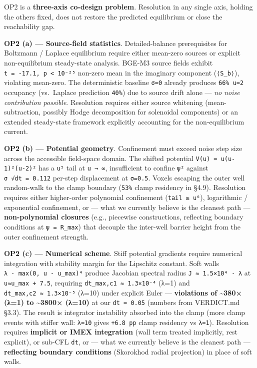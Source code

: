 \documentclass[
]{article}
\begin{document}
OP2 is a \textbf{three-axis co-design problem}. Resolution in any single
axis, holding the others fixed, does not restore the predicted
equilibrium or close the reachability gap.

\textbf{OP2 (a) --- Source-field statistics}. Detailed-balance
prerequisites for Boltzmann / Laplace equilibrium require either
mean-zero sources or explicit non-equilibrium steady-state analysis.
BGE-M3 source fields exhibit
\texttt{t\ =\ -17.1,\ p\ \textless{}\ 10⁻²⁵} non-zero mean in the
imaginary component (\texttt{⟨S\_b⟩}), violating mean-zero. The
deterministic baseline \texttt{σ=0} already produces \texttt{66\%\ u=2}
occupancy (vs.~Laplace prediction \texttt{40\%}) due to source drift
alone --- \emph{no noise contribution possible}. Resolution requires
either source whitening (mean-subtraction, possibly Hodge decomposition
for solenoidal components) or an extended steady-state framework
explicitly accounting for the non-equilibrium current.

\textbf{OP2 (b) --- Potential geometry}. Confinement must exceed noise
step size across the accessible field-space domain. The shifted
potential \texttt{V(u)\ =\ u(u-1)²(u-2)²} has a \texttt{u⁵} tail at
\texttt{u\ →\ ∞}, insufficient to confine
\texttt{\textbar{}ψ\textbar{}²} against \texttt{σ\ √dt\ =\ 0.112}
per-step displacement at \texttt{σ=0.5}. Voxels escaping the outer well
random-walk to the clamp boundary (\texttt{53\%} clamp residency in
§4.9). Resolution requires either higher-order polynomial confinement
(\texttt{tail\ ≥\ u⁶}), logarithmic / exponential confinement, or ---
what we currently believe is the cleanest path ---
\textbf{non-polynomial closures} (e.g., piecewise constructions,
reflecting boundary conditions at
\texttt{\textbar{}ψ\textbar{}\ =\ R\_max}) that decouple the inter-well
barrier height from the outer confinement strength.

\textbf{OP2 (c) --- Numerical scheme}. Stiff potential gradients require
numerical integration with stability margin for the Lipschitz constant.
Soft walls \texttt{λ\ ·\ max(0,\ u\ -\ u\_max)⁴} produce Jacobian
spectral radius \texttt{J\ ≈\ 1.5×10⁴\ ·\ λ} at
\texttt{u≈u\_max\ +\ 7.5}, requiring \texttt{dt\_max,c1\ ≈\ 1.3×10⁻⁴}
(λ=1) and \texttt{dt\_max,c2\ ≈\ 1.3×10⁻⁵} (λ=10) under explicit Euler
--- \textbf{violations of \textasciitilde380× (λ=1) to
\textasciitilde3800× (λ=10)} at our \texttt{dt\ =\ 0.05} (numbers from
VERDICT.md §3.3). The result is integrator instability absorbed into the
clamp (more clamp events with stiffer wall: \texttt{λ=10} gives
\texttt{+6.8\ pp} clamp residency vs \texttt{λ=1}). Resolution requires
\textbf{implicit or IMEX integration} (wall term treated implicitly,
rest explicit), or sub-CFL \texttt{dt}, or --- what we currently believe
is the cleanest path --- \textbf{reflecting boundary conditions}
(Skorokhod radial projection) in place of soft walls.
\end{document}
